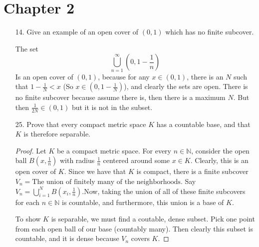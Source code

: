 \documentclass[hidelinks,12pt]{article}
\title{\scalebox{1.5}{Math 724 Homework 2}}
\author{\scalebox{1.5}{Theo Koss}}
\date{September 2024}
\newcommand{\N}{\mathbb{N}}
\begin{document}
\maketitle
\section*{Chapter 2}
\begin{enumerate}
    \item[14.] Give an example of an open cover of \((0,1)\) which has no finite subcover.
        \par\null\par The set \[
        \bigcup_{n=1}^{\infty}(0,1-\frac{1}{n})
        \]
        Is an open cover of \((0,1)\), because for any \(x\in(0,1)\), there is an \(N\) such that \(1-\frac{1}{N}<x\) (So \(x\in(0,1-\frac{1}{N})\)), and clearly the sets are open. There is no finite subcover because assume there is, then there is a maximum \(N\). But then \(\frac{1}{2N}\in(0,1)\) but it is not in the subset.
    \item[25.] Prove that every compact metric space \(K\) has a countable base, and that \(K\) is therefore separable.
        \begin{proof}
            Let \(K\) be a compact metric space. For every \(n\in\N\), consider the open ball \(B(x,\frac{1}{n})\) with radius \(\frac{1}{n}\) centered around some \(x\in K\). Clearly, this is an open cover of \(K\). Since we have that \(K\) is compact, there is a finite subcover \(V_{n}=\text{The union of finitely many of the neighborhoods}\). Say \(V_{n}=\bigcup_{i=1}^{N}B(x_{i},\frac{1}{n})\).Now, taking the union of all of these finite subcovers for each \(n\in\N\) is countable, and furthermore, this union is a base of \(K\). \par\null\par To show \(K\) is separable, we must find a coutable, dense subset. Pick one point from each open ball of our base (countably many). Then clearly this subset is countable, and it is dense because \(V_{n}\) covers \(K\).
        \end{proof}
\end{enumerate}
\end{document}
